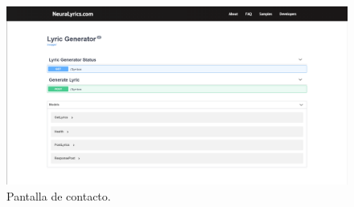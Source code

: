 \documentclass[12pt, a4paper, titlepage]{article}
\begin{document}
		\begin{figure}[H] 
			\includegraphics[width=13.5cm]{./Imagenes/Capturas/pdev.png}
			\centering \caption{Pantalla de contacto.}
		\end{figure}
		
\end{document}
